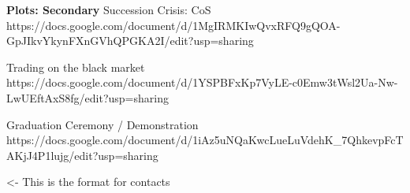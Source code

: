 \documentclass[char]{GL2020}
\begin{document}
\textbf{Plots: Secondary}
Succession Crisis: CoS
https://docs.google.com/document/d/1MgIRMKIwQvxRFQ9gQOA-GpJIkvYkynFXnGVhQPGKA2I/edit?usp=sharing

Trading on the black market 
https://docs.google.com/document/d/1YSPBFxKp7VyLE-c0Emw3tWsl2Ua-Nw-LwUEftAxS8fg/edit?usp=sharing

Graduation Ceremony / Demonstration
https://docs.google.com/document/d/1iAz5uNQaKwcLueLuVdehK_7QhkevpFcTAKjJ4P1lujg/edit?usp=sharing

\begin{itemz}[Goals]
	\item 
\end{itemz}

\begin{itemz}[Notes]
	\item 
\end{itemz}

\begin{contacts}
	\contact{\cTest{}} <- This is the format for contacts 
\end{contacts}
\end{document}
